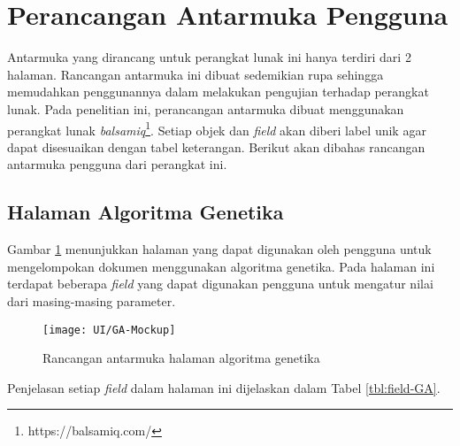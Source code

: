 \section{Perancangan Antarmuka Pengguna}
\label{sec:guidesign}
Antarmuka yang dirancang untuk perangkat lunak ini hanya terdiri dari 2 halaman. Rancangan antarmuka ini dibuat sedemikian rupa sehingga memudahkan penggunannya dalam melakukan pengujian terhadap perangkat lunak. Pada penelitian ini, perancangan antarmuka dibuat menggunakan perangkat lunak \textit{balsamiq}\footnote{https://balsamiq.com/}. Setiap objek dan \textit{field} akan diberi label unik agar dapat disesuaikan dengan tabel keterangan. Berikut akan dibahas rancangan antarmuka pengguna dari perangkat ini.

\subsection{Halaman Algoritma Genetika}
Gambar \ref{fig:UI-GA} menunjukkan halaman yang dapat digunakan oleh pengguna untuk mengelompokan dokumen menggunakan algoritma genetika. Pada halaman ini terdapat beberapa \textit{field} yang dapat digunakan pengguna untuk mengatur nilai dari masing-masing parameter.

\begin{figure}[H]
	\begin{center}
		\texttt{[image: UI/GA-Mockup]}
		\caption{Rancangan antarmuka halaman algoritma genetika}
		\label{fig:UI-GA}
	\end{center}
\end{figure}

Penjelasan setiap \textit{field} dalam halaman ini dijelaskan dalam Tabel \ref{tbl:field-GA}.

